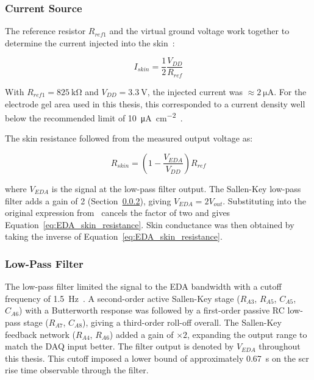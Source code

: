 \subsubsection{Current Source}
\label{sec:EDA_current_source}
The reference resistor $R_{ref1}$ and the virtual ground voltage work together to determine the current injected into the skin~\cite{zangroniz_electrodermal_2017}:

\begin{equation}
    I_{skin} = \frac{1}{2}\frac{V_{DD}}{R_{ref}}
    \label{eq:EDA_skin_current}
\end{equation}

With $R_{ref1} = \SI{825}{\kilo\ohm}$ and $V_{DD} = \SI{3.3}{\volt}$, the injected current was $\approx \SI{2}{\micro\ampere}$. For the electrode gel area used in this thesis, this corresponded to a current density well below the recommended limit of \SI{10}{\micro\ampere\per\centi\meter\squared}~\cite{boucsein_electrodermal_2012}.

The skin resistance followed from the measured output voltage as:

\begin{equation}
    R_{skin} = \left(1 - \frac{V_{EDA}}{V_{DD}}\right) R_{ref}
    \label{eq:EDA_skin_resistance}
\end{equation}

where $V_{EDA}$ is the signal at the low-pass filter output. The Sallen-Key low-pass filter adds a gain of 2 (Section~\ref{sec:EDA_LPF}), giving $V_{EDA} = 2 V_{out}$. Substituting into the original expression from~\cite{zangroniz_electrodermal_2017} cancels the factor of two and gives Equation~\ref{eq:EDA_skin_resistance}.
Skin conductance was then obtained by taking the inverse of Equation~\ref{eq:EDA_skin_resistance}.


\subsubsection{Low-Pass Filter}\label{sec:EDA_LPF}
The low-pass filter limited the signal to the EDA bandwidth with a cutoff frequency of \SI{1.5}{\hertz}~\cite{zangroniz_electrodermal_2017}. A second-order active Sallen-Key stage ($R_{A3}$, $R_{A5}$, $C_{A5}$, $C_{A6}$) with a Butterworth response was followed by a first-order passive RC low-pass stage ($R_{A7}$, $C_{A8}$), giving a third-order roll-off overall. The Sallen-Key feedback network ($R_{A4}$, $R_{A6}$) added a gain of \(\times 2\), expanding the output range to match the DAQ input better. The filter output is denoted by $V_{EDA}$ throughout this thesis. This cutoff imposed a lower bound of approximately \SI{0.67}{\second} on the \gls{scr} rise time observable through the filter.

